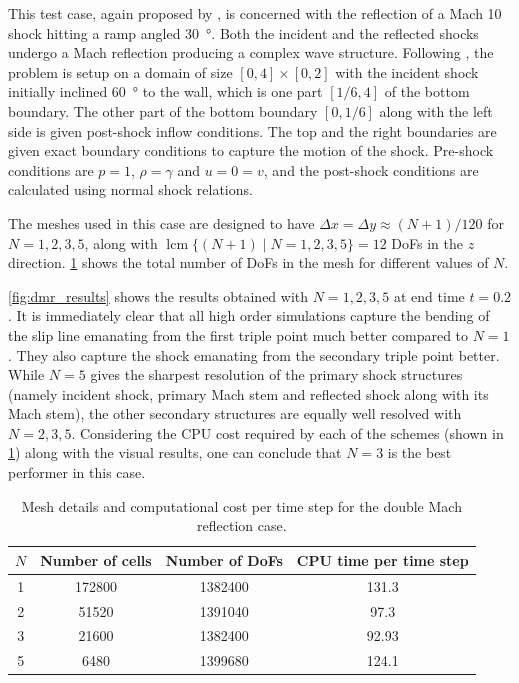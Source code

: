 \documentclass[a4paper,11pt,oneside]{article}
\newcommand{\citear}[1]{\citeauthor{#1} \cite{#1}} %
\DeclareMathOperator{\lcm}{lcm} %
\begin{document}
This test case, again proposed by \citear{woodwardColella1984}, is concerned with the reflection of a Mach 10 shock hitting a ramp angled \SI{30}{\degree}. Both the incident and the reflected shocks undergo a Mach reflection producing a complex wave structure. Following \citear{kemm2016}, the problem is setup on a domain of size $[0,4] \times [0,2]$ with the incident shock initially inclined \SI{60}{\degree} to the wall, which is one part $[1/6,4]$ of the bottom boundary. The other part of the bottom boundary $[0,1/6]$ along with the left side is given post-shock inflow conditions. The top and the right boundaries are given exact boundary conditions to capture the motion of the shock. Pre-shock conditions are $p=1$, $\rho=\gamma$ and $u=0=v$, and the post-shock conditions are calculated using normal shock relations.

The meshes used in this case are designed to have $\Delta x = \Delta y \approx (N+1)/120$ for $N=1,2,3,5$, along with $\lcm \{ (N+1) \mid N=1,2,3,5 \} = 12$ DoFs in the $z$ direction. \cref{tab:dmr_mesh_cpu} shows the total number of DoFs in the mesh for different values of $N$.

\cref{fig:dmr_results} shows the results obtained with $N=1,2,3,5$ at end time $t=0.2$. It is immediately clear that all high order simulations capture the bending of the slip line emanating from the first triple point much better compared to $N=1$. They also capture the shock emanating from the secondary triple point better. While $N=5$ gives the sharpest resolution of the primary shock structures (namely incident shock, primary Mach stem and reflected shock along with its Mach stem), the other secondary structures are equally well resolved with $N=2,3,5$. Considering the CPU cost required by each of the schemes (shown in \cref{tab:dmr_mesh_cpu}) along with the visual results, one can conclude that $N=3$ is the best performer in this case.

\begin{table}[htbp]
    \centering
    \caption{Mesh details and computational cost per time step for the double Mach reflection case.}
    \label{tab:dmr_mesh_cpu}
    \begin{tabular}{cccc}
        \toprule
        $N$ & Number of cells & Number of DoFs & CPU time per time step \\
        \midrule
        1 & 172800 & 1382400 & 131.3 \\
        2 & 51520 & 1391040 & 97.3 \\
        3 & 21600 & 1382400 & 92.93 \\
        5 & 6480 & 1399680 & 124.1 \\
        \bottomrule
    \end{tabular}
\end{table}
\end{document}

